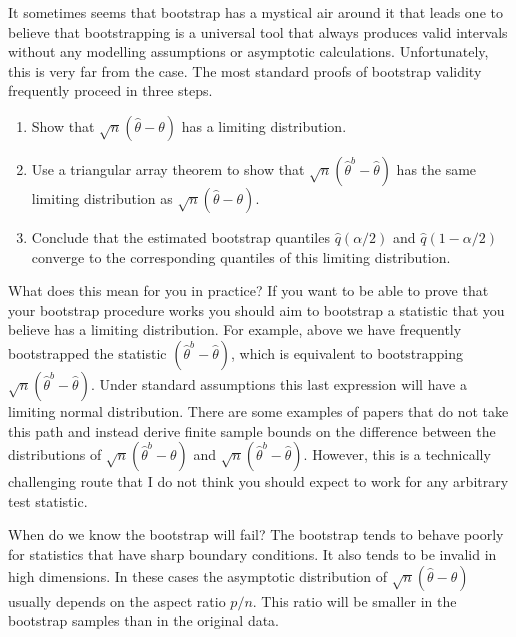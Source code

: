It sometimes seems that bootstrap has a mystical air around it that leads one to believe that bootstrapping is a universal tool that always produces valid intervals without any modelling assumptions or asymptotic calculations. Unfortunately, this is very far from the case. The most standard proofs of bootstrap validity frequently proceed in three steps.
\begin{enumerate}
\item
Show that $\sqrt{n}(\hat{\theta} - \theta)$ has a limiting distribution.
\item
Use a triangular array theorem to show that $\sqrt{n}(\hat{\theta}^b - \hat{\theta})$ has the same limiting distribution as $\sqrt{n}(\hat{\theta} - \theta)$. 
\item
Conclude that the estimated bootstrap quantiles $\hat{q}(\alpha/2)$ and $\hat{q}(1-\alpha/2)$ converge to the corresponding quantiles of this limiting distribution.
\end{enumerate}
What does this mean for you in practice? If you want to be able to prove that your bootstrap procedure works you should aim to bootstrap a statistic that you believe has a limiting distribution. For example, above we have frequently bootstrapped the statistic $(\hat{\theta}^b - \hat{\theta})$, which is equivalent to bootstrapping $\sqrt{n}(\hat{\theta}^b - \hat{\theta}) $. Under standard assumptions this last expression will have a limiting normal distribution. There are some examples of papers that do not take this path and instead derive finite sample bounds on the difference between the distributions of $\sqrt{n}(\hat{\theta}^b - \theta)$ and  $\sqrt{n}(\hat{\theta}^b - \hat{\theta})$. However, this is a technically challenging route that I do not think you should expect to work for any arbitrary test statistic.

When do we know the bootstrap will fail? The bootstrap tends to behave poorly for statistics that have sharp boundary conditions. It also tends to be invalid in high dimensions. In these cases the asymptotic distribution  of $\sqrt{n}(\hat{\theta} - \theta)$ usually depends on the aspect ratio $p/n$. This ratio will be smaller in the bootstrap samples than in the original data.
